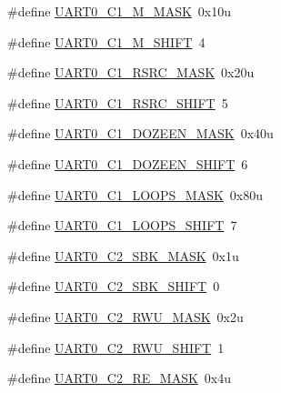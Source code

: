 \begin{DoxyCompactItemize}
\item 
\#define \hyperlink{group___u_a_r_t0___register___masks_gabdd6ccef43f8d2a143ed2cbd16b94cf1}{U\+A\+R\+T0\+\_\+\+C1\+\_\+\+M\+\_\+\+M\+A\+SK}~0x10u
\item 
\#define \hyperlink{group___u_a_r_t0___register___masks_ga8d31680c97fb0821a0613ea8edc4982e}{U\+A\+R\+T0\+\_\+\+C1\+\_\+\+M\+\_\+\+S\+H\+I\+FT}~4
\item 
\#define \hyperlink{group___u_a_r_t0___register___masks_ga746b65fa3c8e5bb60aa81f98984ea2a3}{U\+A\+R\+T0\+\_\+\+C1\+\_\+\+R\+S\+R\+C\+\_\+\+M\+A\+SK}~0x20u
\item 
\#define \hyperlink{group___u_a_r_t0___register___masks_ga6c6190c9625b3cae766cb5e83ec51ee9}{U\+A\+R\+T0\+\_\+\+C1\+\_\+\+R\+S\+R\+C\+\_\+\+S\+H\+I\+FT}~5
\item 
\#define \hyperlink{group___u_a_r_t0___register___masks_ga96d43575fd3133661535f83017c89298}{U\+A\+R\+T0\+\_\+\+C1\+\_\+\+D\+O\+Z\+E\+E\+N\+\_\+\+M\+A\+SK}~0x40u
\item 
\#define \hyperlink{group___u_a_r_t0___register___masks_ga5d6e4f4ab4b49ca54f600ff72198acbb}{U\+A\+R\+T0\+\_\+\+C1\+\_\+\+D\+O\+Z\+E\+E\+N\+\_\+\+S\+H\+I\+FT}~6
\item 
\#define \hyperlink{group___u_a_r_t0___register___masks_ga652e29ee005896dc658da4a9f4b45648}{U\+A\+R\+T0\+\_\+\+C1\+\_\+\+L\+O\+O\+P\+S\+\_\+\+M\+A\+SK}~0x80u
\item 
\#define \hyperlink{group___u_a_r_t0___register___masks_ga314b9a28f9ddde7c21b9c62b8bbab5a4}{U\+A\+R\+T0\+\_\+\+C1\+\_\+\+L\+O\+O\+P\+S\+\_\+\+S\+H\+I\+FT}~7
\item 
\#define \hyperlink{group___u_a_r_t0___register___masks_ga13e4f48ae7752289f4d05530569f86a2}{U\+A\+R\+T0\+\_\+\+C2\+\_\+\+S\+B\+K\+\_\+\+M\+A\+SK}~0x1u
\item 
\#define \hyperlink{group___u_a_r_t0___register___masks_gaa10ba8ef529e39693f0e8101fdec07fc}{U\+A\+R\+T0\+\_\+\+C2\+\_\+\+S\+B\+K\+\_\+\+S\+H\+I\+FT}~0
\item 
\#define \hyperlink{group___u_a_r_t0___register___masks_gae7b3477741c9fb0783930456da17ac03}{U\+A\+R\+T0\+\_\+\+C2\+\_\+\+R\+W\+U\+\_\+\+M\+A\+SK}~0x2u
\item 
\#define \hyperlink{group___u_a_r_t0___register___masks_ga2b35477c4d08786d549ff1908f1571e7}{U\+A\+R\+T0\+\_\+\+C2\+\_\+\+R\+W\+U\+\_\+\+S\+H\+I\+FT}~1
\item 
\#define \hyperlink{group___u_a_r_t0___register___masks_gac49427a605bbd952edc2790821b19161}{U\+A\+R\+T0\+\_\+\+C2\+\_\+\+R\+E\+\_\+\+M\+A\+SK}~0x4u
\item 

\end{DoxyCompactItemize}
